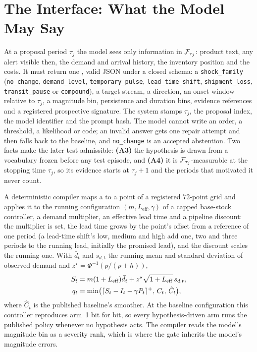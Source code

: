 \section{The Interface: What the Model May Say}
\label{sec:spec}
\label{sec:compile}

At a proposal period $\tau_j$ the model sees only information in $\mathcal{F}_{\tau_j}$: product
text, any alert visible then, the demand and arrival history, the inventory position and the
costs. It must return one \shockspec{}, valid JSON under a closed schema: a
\texttt{shock\_family} (\texttt{no\_change}, \texttt{demand\_level}, \texttt{temporary\_pulse},
\texttt{lead\_time\_shift}, \texttt{shipment\_loss}, \texttt{transit\_pause} or
\texttt{compound}), a target stream, a direction, an onset window relative to $\tau_j$, a
magnitude bin, persistence and duration bins, evidence references and a registered
prospective signature. The system stamps
$\tau_j$, the proposal index, the model identifier and the prompt hash. The model cannot write
an order, a threshold, a likelihood or code; an invalid answer gets one repair attempt and then
falls back to the baseline, and \texttt{no\_change} is an accepted abstention. Two facts make
the later test admissible: \textbf{(A3)} the hypothesis is drawn from a vocabulary frozen before
any test episode, and \textbf{(A4)} it is $\mathcal{F}_{\tau_j}$-measurable at the stopping time
$\tau_j$, so its evidence starts at $\tau_j + 1$ and the periods that motivated it never count.

A deterministic compiler maps a \shockspec{} to a point of a registered 72-point grid and
applies it to the running configuration $(m, L_{\mathrm{eff}}, \gamma)$ of a capped base-stock
controller, a demand multiplier, an effective lead time and a pipeline discount: the
multiplier is set, the lead time grows by the point's offset from a reference of one period
(a lead-time shift's low, medium and high add one, two and three periods to the running lead,
initially the promised lead), and the discount scales the running one. With $\bar d_t$ and $s_{d,t}$ the running mean and
standard deviation of observed demand and $z^\star = \Phi^{-1}(p/(p+h))$,
\begin{align}
S_t &= m(1+L_{\mathrm{eff}})\bar d_t + z^\star\sqrt{1+L_{\mathrm{eff}}}\,s_{d,t}, \notag\\
q_t &= \min\bigl(\lceil S_t - I_t - \gamma P_t\rceil^+,\, C_t,\, \hat C_t\bigr),
\label{eq:controller}
\end{align}
where $\hat C_t$ is the published baseline's smoother. At the baseline configuration this
controller reproduces arm~1 bit for bit, so every hypothesis-driven arm runs the published policy whenever no
hypothesis acts. The compiler reads the model's magnitude bin as a severity rank, which is
where the gate inherits the model's magnitude errors.
